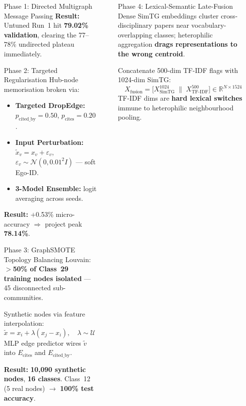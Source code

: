 \documentclass[final]{beamer}
\newlength{\sepwidth}
\newlength{\colwidth}
\newcommand{\separatorcolumn}{\begin{column}{\sepwidth}\end{column}}
\begin{document}
\begin{frame}[t]
\begin{columns}[t]
\begin{column}{\colwidth}
\begin{block}{Phase 1: Directed Multigraph Message Passing}
    \textbf{Result:} Untuned Run~1 hit \textbf{79.02\% validation},
    clearing the 77--78\% undirected plateau immediately.
  \end{block}

  \begin{block}{Phase 2: Targeted Regularisation}
    Hub-node memorisation broken via:
    \begin{itemize}
      \item \textbf{Targeted DropEdge:} $p_\text{cited\_by}{=}0.50$,
            $p_\text{cites}{=}0.20$.
      \item \textbf{Input Perturbation:}
            $\tilde{x}_v{=}x_v{+}\varepsilon_v$,\;
            $\varepsilon_v{\sim}\mathcal{N}(0,0.01^2 I)$ --- soft Ego-ID.
      \item \textbf{3-Model Ensemble:} logit averaging across seeds.
    \end{itemize}
    \textbf{Result:} $+$0.53\% micro-accuracy $\Rightarrow$
    project peak \textbf{78.14\%}.
  \end{block}

  \begin{block}{Phase 3: GraphSMOTE Topology Balancing}
    Louvain: \textbf{$>$50\% of Class~29 training nodes isolated} ---
    45 disconnected sub-communities.

    Synthetic nodes via feature interpolation:
    \[
      \tilde{x}=x_i+\lambda(x_j-x_i),\quad\lambda\sim\mathcal{U}(0,1)
    \]
    MLP edge predictor wires $\tilde{v}$ into $E_\text{cites}$ and
    $E_\text{cited\_by}$.

    \textbf{Result:} \textbf{10{,}090 synthetic nodes}, \textbf{16 classes}.
    Class~12 (5 real nodes) $\to$ \textbf{100\% test accuracy}.
  \end{block}

\end{column}
\separatorcolumn

\begin{column}{\colwidth}

  \begin{block}{Phase 4: Lexical-Semantic Late-Fusion}
    Dense SimTG embeddings cluster cross-disciplinary papers near
    vocabulary-overlapping classes; heterophilic aggregation
    \textbf{drags representations to the wrong centroid}.

    Concatenate 500-dim TF-IDF flags with 1024-dim SimTG:
    \[
      X_\text{fusion}=\bigl[X^\text{1024}_\text{SimTG}\;\|\;
        X^\text{500}_\text{TF-IDF}\bigr]\in\mathbb{R}^{N\times1524}
    \]
    TF-IDF dims are \textbf{hard lexical switches} immune to heterophilic
    neighbourhood pooling.


\end{block}
\end{column}
\end{columns}
\end{frame}
\end{document}
